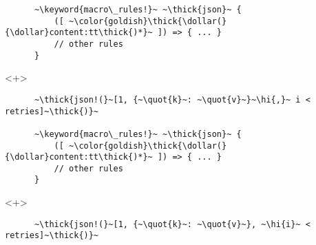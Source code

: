 \documentclass[usepdftitle=false,aspectratio=169]{beamer}
\newcommand{\dollar}{\makebox[\widthof{\$}][c]{\$}}
\newcommand{\thick}[1]{\contourlength{0.16pt}\contour[10]{black}{#1}}
\newcommand{\slantbox}[2][.5]
  {%
    \mbox
      {%
        \sbox{\foobox}{#2}%
        \hskip\wd\foobox
        \pdfsave
        \pdfsetmatrix{1 0 #1 1}%
        \llap{\usebox{\foobox}}%
        \pdfrestore
      }%
  }
\newcommand{\backslantbox}[2][.5]
  {%
    \mbox
      {%
        \sbox{\foobox}{#2}%
        \hskip\wd\foobox
        \pdfsave
        \pdfsetmatrix{-1 0 #1 1}%
        \llap{\usebox{\foobox}}%
        \pdfrestore
      }%
  }
\newcommand{\hi}[1]{%
\tikz[baseline=(A.base)]
 \node[highlighting=yellowbg,inner sep=0pt,text depth=0pt] (A) {#1};%
}
\newcommand{\openquote}{\backslantbox[.2]{\hspace{11pt}''\hspace{-11pt}}}
\newcommand{\closequote}{\slantbox[-.2]{\hspace{2pt}''\hspace{-2pt}}}
\newcommand{\blackquote}[1]{\openquote#1\closequote}
\newcommand{\quot}[1]{{\color{redish}\blackquote{#1}}}
\newcommand{\keyword}[1]{\color{greenish}#1}
\begin{document}
\begin{frame}[fragile]
\begin{onlyenv}
\begin{verbatim}
      ~\keyword{macro\_rules!}~ ~\thick{json}~ {
          ([ ~\color{goldish}\thick{\dollar(}{\dollar}content:tt\thick{)*}~ ]) => { ... }
          // other rules
      }
    \end{verbatim}
  \end{onlyenv}
  \begin{onlyenv}<+>
    \vspace{-20.5pt}
    \begin{verbatim}
      ~\thick{json!(}~[1, {~\quot{k}~: ~\quot{v}~}~\hi{,}~ i < retries]~\thick{)}~

      ~\keyword{macro\_rules!}~ ~\thick{json}~ {
          ([ ~\color{goldish}\thick{\dollar(}{\dollar}content:tt\thick{)*}~ ]) => { ... }
          // other rules
      }
    \end{verbatim}
  \end{onlyenv}
  \begin{onlyenv}<+>
    \vspace{-20.5pt}
    \begin{verbatim}
      ~\thick{json!(}~[1, {~\quot{k}~: ~\quot{v}~}, ~\hi{i}~ < retries]~\thick{)}~


\end{verbatim}
\end{onlyenv}
\end{frame}
\end{document}
